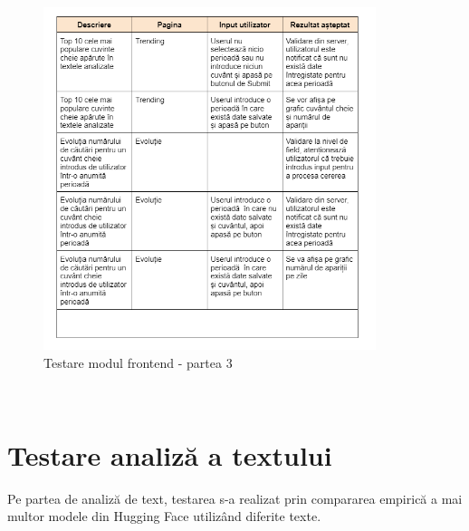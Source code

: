 \begin{figure}[ht]
	\centering
	\includegraphics[height=100mm]{figs/testareFE3.png}
    \caption{Testare modul frontend - partea 3}
	\label{fig:testareFE3}
\end{figure}
\ \\
\section{Testare analiză a textului}
Pe partea de analiză de text, testarea s-a realizat prin compararea empirică a mai multor modele din Hugging Face utilizând diferite texte.